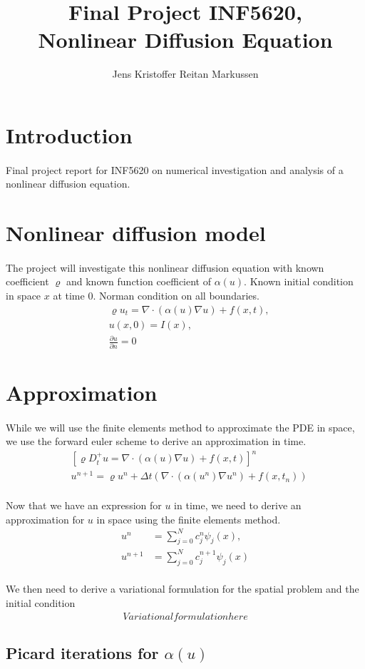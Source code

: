 \documentclass[11pt,a4paper]{article}
\author{Jens Kristoffer Reitan Markussen}
\title{Final Project INF5620,\\ Nonlinear Diffusion Equation}
\begin{document}
\maketitle

\section{Introduction}
\paragraph*{}
Final project report for INF5620 on numerical investigation and analysis of a nonlinear diffusion equation.

\section{Nonlinear diffusion model}
\paragraph*{}
The project will investigate this nonlinear diffusion equation with known coefficient $\varrho$ and known function coefficient of $\alpha(u)$. Known initial condition in space $x$ at time $0$. Norman condition on all boundaries.
\begin{align}
& \varrho u_t = \nabla \cdot (\alpha(u)\nabla u) + f(x,t),\\
& u(x,0)=I(x),\\
& \frac{\partial u}{\partial n} = 0
\end{align}

\section{Approximation}
\paragraph*{} 
While we will use the finite elements method to approximate the PDE in space, we use the forward euler scheme to derive an approximation in time.
\begin{align}
 & \left[\varrho D^+_t u  = \nabla \cdot (\alpha(u)\nabla u) + f(x,t)\right]^n\\
 & u^{n+1}  = \varrho u^n +\Delta t (\nabla \cdot (\alpha(u^n)\nabla u^n)+ f(x,t_n))
\end{align}
\paragraph*{}
Now that we have an expression for $u$ in time, we need to derive an approximation for $u$ in space using the finite elements method.
\begin{align*}
u^n &= \sum_{j=0}^N c^n_j \psi_j(x), \\
u^{n+1} &= \sum_{j=0}^N c^{n+1}_j \psi_j(x)
\end{align*}
\paragraph*{}
We then need to derive a variational formulation for the spatial problem and the initial condition
\begin{align*}
Variationalformulationhere
\end{align*}

\subsection{Picard iterations for $\alpha(u)$}
\end{document}
